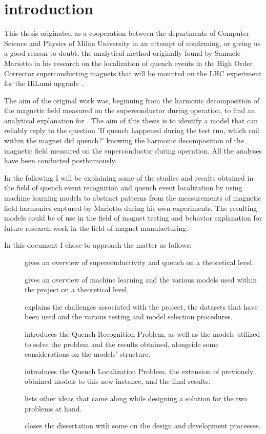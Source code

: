\chapter{introduction}
This thesis originated as a cooperation between the departments of Computer Science and Physics of
Milan University in an attempt of confirming, or giving us a good reason to doubt, the analytical
method originally found by Samuele Mariotto in his research on the localization of quench events in
the High Order Corrector superconducting magnets that will be mounted on the \textsc{LHC} experiment for the
HiLumi upgrade \cite{mariotto2022} \cite{mariotto2022-generic}.

\smallskip

The aim of the original work was, beginning from the harmonic decomposition of the magnetic
field measured on the superconductor during operation, to find an analytical explanation for \qlp.
The aim of this thesis is to identify a model that can reliably reply to the question 'If quench
happened during the test run, which coil within the magnet did quench?' knowing the harmonic
decomposition of the magnetic field measured on the superconductor during operation. All the
analyses have been conducted posthumously.

\smallskip

In the following I will be explaining some of the studies and results obtained in the field of
quench event recognition and quench event localization by using machine learning models to abstract
patterns from the measurements of magnetic field harmonics captured by Mariotto during his own
experiments. The resulting models could be of use in the field of magnet testing and behavior
explanation for future research work in the field of magnet manufacturing.

\smallskip

In this document I chose to approach the matter as follows:
\begin{description}
	\item[] gives an overview of superconductivity and quench on a
		theoretical level.
	\item[] gives an overview of machine learning and the various models used
		within the project on a theoretical level.
	\item[] explains the challenges associated with the project, the datasets
		that have been used and the various testing and model selection procedures.
	\item[] introduces the Quench Recognition Problem, as well as the models
		utilized to solve the problem and the results obtained, alongside some
		considerations on the models' structure.
	\item[] introduces the Quench Localization Problem, the extension of previously
		obtained models to this new instance, and the final results.
	\item[] lists other ideas that came along while designing a solution for
		the two problems at hand.
	\item[] closes the dissertation with some on the design and development
		processes.
\end{description}
